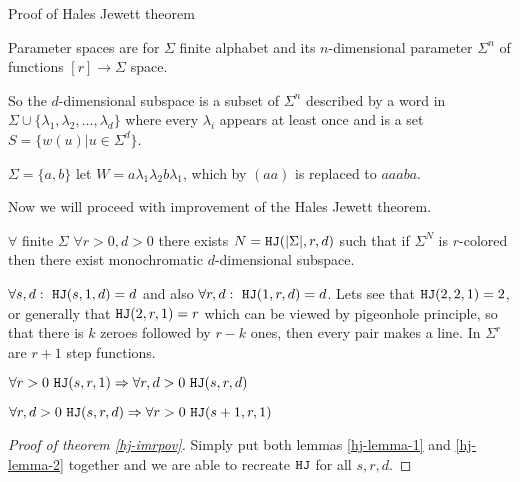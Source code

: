 \begin{topic}{Proof of Hales Jewett theorem}
	\begin{defn}
		Parameter spaces are for $\Sigma$ finite alphabet and its $n$-dimensional parameter $\Sigma^n$ of functions $[r] \to \Sigma$ space.
	\end{defn}

	So the $d$-dimensional subspace is a subset of $\Sigma^n$ described by a word in $\Sigma \cup \{\lambda_1, \lambda_2, \dots, \lambda_d\}$ where every $\lambda_i$ appears at least once and is a set $S = \{w(u) | u \in \Sigma^d\}$.
	
	\begin{example}
		$\Sigma = \{a,b\}$ let $W = a \lambda_1 \lambda_2 b \lambda_1$, which by $(aa)$ is replaced to $aaaba$.
	\end{example}

	Now we will proceed with improvement of the Hales Jewett theorem.
	
	\begin{thm}
		$\forall$ finite $\Sigma$ $\forall r > 0, d > 0$ there exists $N = \mathtt{HJ}(|\Sigma|, r, d)$ such that if $\Sigma^N$ is $r$-colored then there exist monochromatic $d$-dimensional subspace.
		\label{hj-imrpov}
	\end{thm}

	\begin{observ}
		$\forall s, d: \ \mathtt{HJ} (s, 1, d) = d$ and also $\forall r, d: \ \mathtt{HJ}(1, r, d) = d$. Lets see that $\mathtt{HJ}(2,2,1) = 2$, or generally that $\mathtt{HJ}(2,r,1) = r$ which can be viewed by pigeonhole principle, so that there is $k$ zeroes followed by $r - k$ ones, then every pair makes a line. In $\Sigma^r$ are $r + 1$ step functions.
	\end{observ}

	\begin{lemma}
		$\forall r > 0 \ \mathtt{HJ}(s,r,1) \Rightarrow \forall r, d > 0 \ \mathtt{HJ}(s,r,d)$
		\label{hj-lemma-1}
	\end{lemma}

	\begin{lemma}
		$\forall r, d > 0 \ \mathtt{HJ}(s,r,d) \Rightarrow \forall r > 0 \ \mathtt{HJ}(s+1, r, 1)$
		\label{hj-lemma-2}
	\end{lemma}

	\begin{proof}[Proof of theorem \ref{hj-imrpov}]
		Simply put both lemmas \ref{hj-lemma-1} and \ref{hj-lemma-2} together and we are able to recreate $\mathtt{HJ}$ for all $s, r, d$.
	\end{proof}


\end{topic}
